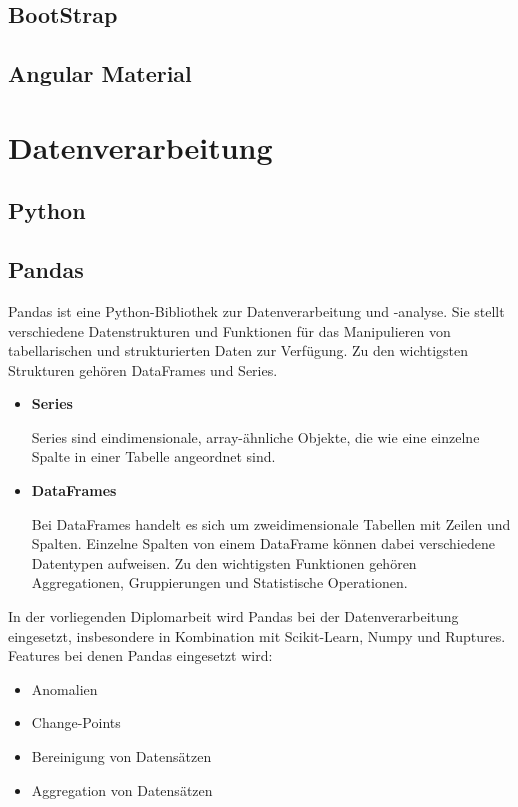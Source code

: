 \documentclass{report}
\begin{document}
\subsection{BootStrap}
\subsection{Angular Material}

\section{Datenverarbeitung}
\subsection{Python}
\subsection{Pandas}
Pandas ist eine Python-Bibliothek zur Datenverarbeitung und -analyse. Sie stellt verschiedene Datenstrukturen und Funktionen für das Manipulieren von tabellarischen und strukturierten Daten zur Verfügung. Zu den wichtigsten Strukturen gehören DataFrames und Series.
\begin{itemize}
    \item \textbf{Series} \\
    \begin{minipage}[t]{\linewidth}
        Series sind eindimensionale, array-ähnliche Objekte, die wie eine einzelne Spalte in einer Tabelle angeordnet sind.
    \end{minipage}

    \item \textbf{DataFrames} \\
    \begin{minipage}[t]{\linewidth}
        Bei DataFrames handelt es sich um zweidimensionale Tabellen mit Zeilen und Spalten. Einzelne Spalten von einem DataFrame können dabei verschiedene Datentypen aufweisen. Zu den wichtigsten Funktionen gehören Aggregationen, Gruppierungen und Statistische Operationen. 
    \end{minipage}
\end{itemize}
  In der vorliegenden Diplomarbeit wird Pandas bei der Datenverarbeitung eingesetzt, insbesondere in Kombination mit Scikit-Learn, Numpy und Ruptures.
  Features bei denen Pandas eingesetzt wird:
  \begin{itemize}
      \item Anomalien
      \item Change-Points
      \item Bereinigung von Datensätzen
      \item Aggregation von Datensätzen
  \end{itemize}
\end{document}
